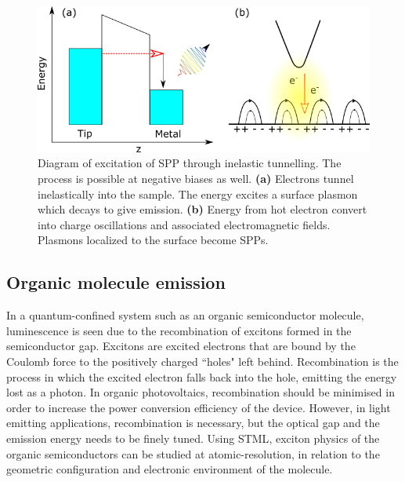 
\begin{figure} [h]
    \centering
    \includegraphics[width=\textwidth]{pictures/spp_emission.png}
    \caption{ Diagram of excitation of SPP through inelastic tunnelling. The process is possible at negative biases as well. \textbf{(a)} Electrons tunnel inelastically into the sample. The energy excites a surface plasmon which decays to give emission. \textbf{(b)} Energy from hot electron convert into charge oscillations and associated electromagnetic fields. Plasmons localized to the surface become SPPs. }
    \label{fig:exptech:iet-het}
\end{figure}

\subsection{Organic molecule emission}

In a quantum-confined system such as an organic semiconductor molecule, luminescence is seen due to the recombination of excitons formed in the semiconductor gap. Excitons are excited electrons that are bound by the Coulomb force to the positively charged ``holes" left behind. Recombination is the process in which the excited electron falls back into the hole, emitting the energy lost as a photon. In organic photovoltaics, recombination should be minimised in order to increase the power conversion efficiency of the device. However, in light emitting applications, recombination is necessary, but the optical gap and the emission energy needs to be finely tuned. Using \ac{STML}, exciton physics of the organic semiconductors can be studied at atomic-resolution, in relation to the geometric configuration and electronic environment of the molecule.

